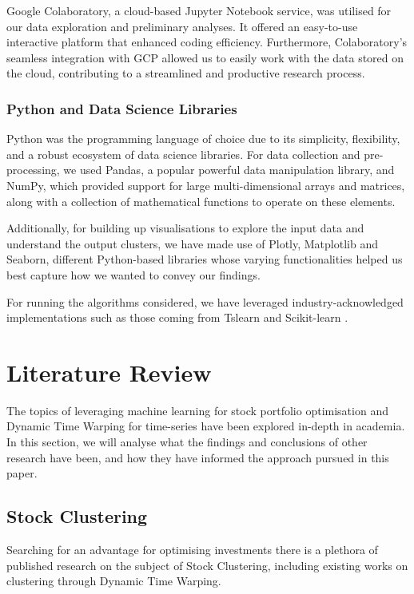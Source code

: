 \documentclass[11pt]{article}
\begin{document}
Google Colaboratory, a cloud-based Jupyter Notebook service, was utilised for our data exploration and preliminary analyses. It offered an easy-to-use interactive platform that enhanced coding efficiency. Furthermore, Colaboratory's seamless integration with GCP allowed us to easily work with the data stored on the cloud, contributing to a streamlined and productive research process.

\subsubsection{Python and Data Science Libraries}

Python was the programming language of choice due to its simplicity, flexibility, and a robust ecosystem of data science libraries. For data collection and pre-processing, we used Pandas, a popular powerful data manipulation library, and NumPy, which provided support for large multi-dimensional arrays and matrices, along with a collection of mathematical functions to operate on these elements. 

Additionally, for building up visualisations to explore the input data and understand the output clusters, we have made use of Plotly, Matplotlib and Seaborn, different Python-based libraries whose varying functionalities helped us best capture how we wanted to convey our findings.

For running the algorithms considered, we have leveraged industry-acknowledged implementations such as those coming from Tslearn \cite{tslearn} and Scikit-learn \cite{scikit}.

\section{Literature Review}
\label{sec:literature_review}

The topics of leveraging machine learning for stock portfolio optimisation and Dynamic Time Warping for time-series have been explored in-depth in academia. In this section, we will analyse what the findings and conclusions of other research have been, and how they have informed the approach pursued in this paper.

\subsection{Stock Clustering}

Searching for an advantage for optimising investments there is a plethora of published research on the subject of Stock Clustering, including existing works on clustering through Dynamic Time Warping.
\end{document}
